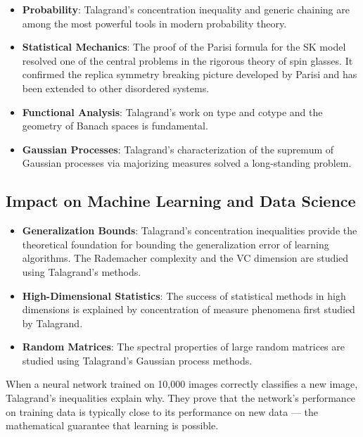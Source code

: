 \begin{itemize}
\item \textbf{Probability}: Talagrand's concentration inequality and generic chaining are among the most powerful tools in modern probability theory.

\item \textbf{Statistical Mechanics}: The proof of the Parisi formula for the SK model resolved one of the central problems in the rigorous theory of spin glasses. It confirmed the replica symmetry breaking picture developed by Parisi and has been extended to other disordered systems.

\item \textbf{Functional Analysis}: Talagrand's work on type and cotype and the geometry of Banach spaces is fundamental.

\item \textbf{Gaussian Processes}: Talagrand's characterization of the supremum of Gaussian processes via majorizing measures solved a long-standing problem.
\end{itemize}

\subsection{Impact on Machine Learning and Data Science}

\begin{itemize}
\item \textbf{Generalization Bounds}: Talagrand's concentration inequalities provide the theoretical foundation for bounding the generalization error of learning algorithms. The Rademacher complexity and the VC dimension are studied using Talagrand's methods.

\item \textbf{High-Dimensional Statistics}: The success of statistical methods in high dimensions is explained by concentration of measure phenomena first studied by Talagrand.

\item \textbf{Random Matrices}: The spectral properties of large random matrices are studied using Talagrand's Gaussian process methods.
\end{itemize}

\begin{whyitmatters}
When a neural network trained on 10,000 images correctly classifies a new image, Talagrand's inequalities explain why. They prove that the network's performance on training data is typically close to its performance on new data --- the mathematical guarantee that learning is possible.
\end{whyitmatters}

